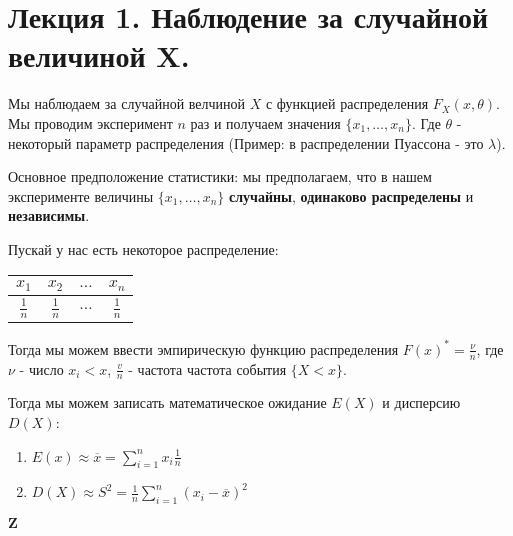 \section*{Лекция 1. Наблюдение за случайной величиной X.}

Мы наблюдаем за случайной велчиной $X$ с функцией распределения $F_X(x, \theta)$. Мы проводим эксперимент $n$ раз и получаем значения $\{x_1, \ldots, x_n\}$. Где $\theta$ - некоторый параметр распределения (Пример: в распределении Пуассона - это $\lambda$).

\begin{definition}
    Основное предположение статистики:
    мы предполагаем, что в нашем эксперименте величины $\{x_1, \ldots, x_n\}$ \textbf{случайны}, \textbf{одинаково распределены} и \textbf{независимы}.
\end{definition}

Пускай у нас есть некоторое распределение:
\begin{table} [H]
    \centering
    \begin{tabular}{|c|c|c|c|}
        \hline
        $x_1$         & $x_2$         & $\ldots$ & $x_n$         \\
        \hline
        $\frac{1}{n}$ & $\frac{1}{n}$ & $\ldots$ & $\frac{1}{n}$ \\
        \hline
    \end{tabular}
\end{table}
Тогда мы можем ввести эмпирическую функцию распределения $F(x)^* = \frac{\nu}{n}$, где $\nu$ - число $x_i < x$, $\frac{v}{n}$ - частота частота события $\{X < x\}$.

Тогда мы можем записать математическое ожидание $E(X)$ и дисперсию $D(X)$: 
\begin{enumerate}
    \item $E(x) \approx \overline{x} = \sum\limits_{i = 1}^{n} x_i \frac{1}{n} $
    \item $D(X) \approx S^2 = \frac{1}{n} \sum\limits_{i = 1}^{n} (x_i - \overline{x})^2$
\end{enumerate}
$\mathbf{Z}$